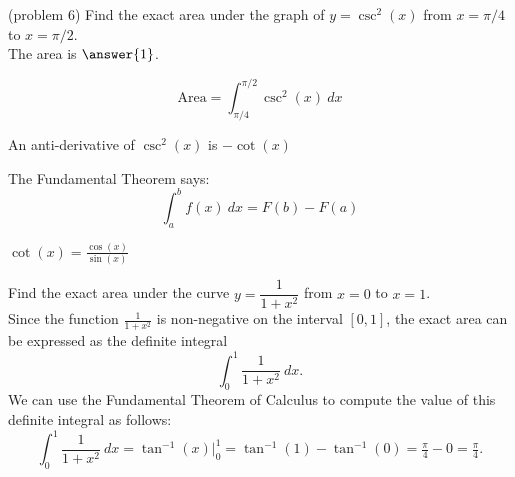 \documentclass[handout]{ximera}
\begin{document}
\begin{problem}(problem 6)
Find the exact area under the graph of $y = \csc^2(x)$ from $x = \pi/4$ to $x = \pi/2$.\\
The area is $\answer{1}$.
 \begin{hint}
  \[
  \text{Area} = \int_{\pi/4}^{\pi/2} \csc^2(x) \ dx
  \]
\end{hint}  
    \begin{hint}
      An anti-derivative of $\csc^2(x)$ is $-\cot(x)$
    \end{hint}
    
    \begin{hint}
      The Fundamental Theorem says:
      \[
      \int_a^b f(x) \ dx = F(b) - F(a)
      \]
    \end{hint}    
		\begin{hint}
      $\cot(x) = \frac{\cos(x)}{\sin(x)}$
    \end{hint}
		
\end{problem}


\begin{example}[example 7]
Find the exact area under the curve $y = \dfrac{1}{1+x^2}$ from $x=0$ to $x= 1$.\\
Since the function $\frac{1}{1+x^2}$ is non-negative on the interval $[0, 1]$, the exact area can be expressed as the definite integral
\[\int_0^{1} \frac{1}{1+x^2} \ dx.\]
We can use the Fundamental Theorem of Calculus to compute the value of this definite integral as follows:
\[
\int_0^{1} \frac{1}{1+x^2} \ dx = \tan^{-1}(x) \Big|_0^1 
= \tan^{-1}(1)- \tan^{-1}(0) = \tfrac{\pi}{4}-0 =\tfrac{\pi}{4}.
\]


\begin{image}
\end{image}


\end{example}
\end{document}
